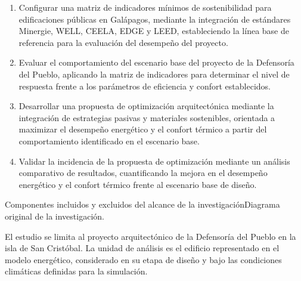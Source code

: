 \begin{landscape}
\noindent
\begin{minipage}[t]{0.47\textwidth}
  \vspace{0pt}\raggedright\sffamily\fontsize{9.2}{12}\selectfont\color{pilotoInk}
  \begin{enumerate}
    \item Configurar una matriz de indicadores mínimos de sostenibilidad para edificaciones públicas en Galápagos, mediante la integración de estándares Minergie, WELL, CEELA, EDGE y LEED, estableciendo la línea base de referencia para la evaluación del desempeño del proyecto.
    \item Evaluar el comportamiento del escenario base del proyecto de la Defensoría del Pueblo, aplicando la matriz de indicadores para determinar el nivel de respuesta frente a los parámetros de eficiencia y confort establecidos.
  \end{enumerate}
\end{minipage}\hfill
\begin{minipage}[t]{0.47\textwidth}
  \vspace{0pt}\raggedright\sffamily\fontsize{9.2}{12}\selectfont\color{pilotoInk}
  \begin{enumerate}
    \setcounter{enumi}{2}
    \item Desarrollar una propuesta de optimización arquitectónica mediante la integración de estrategias pasivas y materiales sostenibles, orientada a maximizar el desempeño energético y el confort térmico a partir del comportamiento identificado en el escenario base.
    \item Validar la incidencia de la propuesta de optimización mediante un análisis comparativo de resultados, cuantificando la mejora en el desempeño energético y el confort térmico frente al escenario base de diseño.
  \end{enumerate}
\end{minipage}


\begin{pilotoTextoGrafico}{\graficoAlcanceIntro}{Componentes incluidos y excluidos del alcance de la investigación}{Diagrama original de la investigación.}

El estudio se limita al proyecto arquitectónico de la Defensoría del Pueblo en la isla de San Cristóbal. La unidad de análisis es el edificio representado en el modelo energético, considerado en su etapa de diseño y bajo las condiciones climáticas definidas para la simulación.


\end{pilotoTextoGrafico}
\end{landscape}
